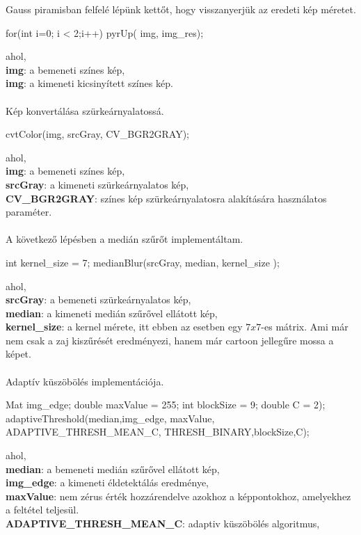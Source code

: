 Gauss piramisban felfelé lépünk kettőt, hogy visszanyerjük az eredeti kép méretet.
\begin{cpp}
 for(int i=0; i < 2;i++){
    pyrUp( img, img_res);
    }
\end{cpp}
ahol, \\
\indent \textbf{img}: a bemeneti színes kép,\\
\indent \textbf{img}: a kimeneti kicsinyített színes kép.\\\\
Kép konvertálása szürkeárnyalatossá. 
\begin{cpp}
cvtColor(img, srcGray, CV_BGR2GRAY);
\end{cpp}
ahol, \\
\indent \textbf{img}: a bemeneti színes kép,\\
\indent \textbf{srcGray}: a kimeneti szürkeárnyalatos kép,\\
\indent \textbf{CV\_BGR2GRAY}: színes kép szürkeárnyalatosra alakítására használatos paraméter.\\ \\
A következő lépésben a medián szűrőt implementáltam.
\begin{cpp}
int kernel_size = 7;
medianBlur(srcGray, median, kernel_size );
\end{cpp}
ahol, \\
\indent \textbf{srcGray}: a bemeneti szürkeárnyalatos kép,\\
\indent \textbf{median}: a kimeneti medián szűrővel ellátott kép,\\
\indent \textbf{kernel\_size}: a kernel mérete, itt ebben az esetben egy $7 x 7$-es mátrix. Ami már nem csak a zaj kiszűrését eredményezi, hanem már cartoon jellegűre mossa a képet.\\ \\
Adaptív küszöbölés implementációja.
\begin{cpp}
Mat img_edge;
double maxValue = 255;
int blockSize = 9;
double C = 2); 
adaptiveThreshold(median,img_edge, maxValue, ADAPTIVE_THRESH_MEAN_C,
		THRESH_BINARY,blockSize,C); 
\end{cpp}
ahol, \\
\indent \textbf{median}: a bemeneti medián szűrővel ellátott kép,\\
\indent \textbf{img\_edge}: a kimeneti éldetektálás eredménye,\\
\indent \textbf{maxValue}: nem zérus érték hozzárendelve azokhoz a képpontokhoz, amelyekhez a feltétel teljesül.\\ 
\indent \textbf{ADAPTIVE\_THRESH\_MEAN\_C}: adaptiv küszöbölés algoritmus,\\
